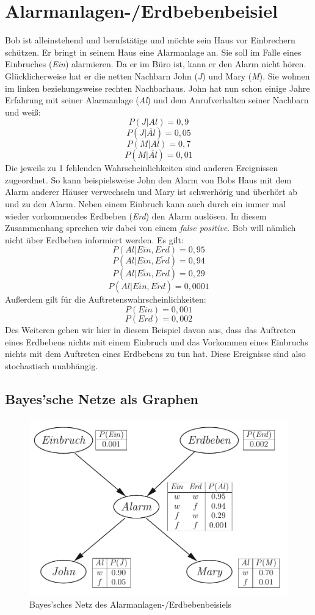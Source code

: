 \section{Alarmanlagen-/Erdbebenbeisiel}
Bob ist alleinstehend und berufstätige und möchte sein Haus vor Einbrechern schützen. Er bringt in seinem Haus eine Alarmanlage an. Sie soll im Falle eines Einbruches (\textit{Ein}) alarmieren. Da er im Büro ist, kann er den Alarm nicht hören. Glücklicherweise hat er die netten Nachbarn John (\textit{J}) und Mary (\textit{M}). Sie wohnen im linken beziehungsweise rechten Nachbarhaus. John hat nun schon einige Jahre Erfahrung mit seiner Alarmanlage (\textit{Al}) und dem Anrufverhalten seiner Nachbarn und weiß: 
\[ P(J\vert Al) = 0,9\] 
\[ P(J\vert \overline{Al}) = 0,05\]
\[ P(M\vert Al) = 0,7\]
\[ P(M\vert \overline{Al} ) = 0,01\]
Die jeweils zu 1 fehlenden Wahrscheinlichkeiten sind anderen Ereignissen zugeordnet. So kann beispielsweise John den Alarm von Bobs Haus mit dem Alarm anderer Häuser verwechseln und Mary ist schwerhörig und überhört ab und zu den Alarm. 
Neben einem Einbruch kann auch durch ein immer mal wieder vorkommendes Erdbeben (\textit{Erd}) den Alarm auslösen. In diesem Zusammenhang sprechen wir dabei von einem \textit{false positive}. Bob will nämlich nicht über Erdbeben informiert werden. Es gilt:
\[ P(Al\vert Ein, Erd) = 0,95\] 
\[ P(Al\vert Ein,\overline{Erd}) = 0,94\]
\[ P(Al\vert \overline{Ein}, Erd) = 0,29\]
\[ P(Al\vert \overline{Ein}, \overline{Erd})  = 0,0001\]
Außerdem gilt für die Auftretenswahrscheinlichkeiten: 
\[ P(Ein) = 0,001\]
\[ P(Erd) = 0,002\]
Des Weiteren gehen wir hier in diesem Beispiel davon aus, dass das Auftreten eines Erdbebens nichts mit einem Einbruch und das Vorkommen eines Einbruchs nichts mit dem Auftreten eines Erdbebens zu tun hat. Diese Ereignisse sind also stochastisch unabhängig.   
\subsection{Bayes'sche Netze als Graphen}


\begin{figure}%
\includegraphics[scale=0.3]{bilder/bspNetz} 
\caption{Bayes'sches Netz des Alarmanlagen-/Erdbebenbeisiels \cite{Ertel16}}
\label{Agenten}
\end{figure}


